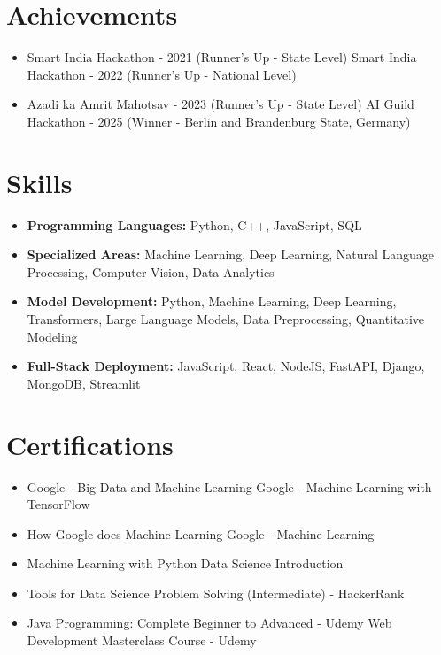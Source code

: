 \documentclass[a4paper,10pt]{article}
\begin{document}
\section*{Achievements}
\begin{itemize}
\item Smart India Hackathon - 2021 (Runner's Up - State Level) \hfill Smart India Hackathon - 2022 (Runner's Up - National Level)
\item Azadi ka Amrit Mahotsav - 2023 (Runner's Up - State Level) \hfill AI Guild Hackathon - 2025 (Winner - Berlin and Brandenburg State, Germany)
\end{itemize}

\section*{Skills}
\begin{itemize}
  \item \textbf{Programming Languages:} Python, C++, JavaScript, SQL
  \item \textbf{Specialized Areas:} Machine Learning, Deep Learning, Natural Language Processing, Computer Vision, Data Analytics
  \item \textbf{Model Development:} Python, Machine Learning, Deep Learning, Transformers, Large Language Models, Data Preprocessing, Quantitative Modeling
  \item \textbf{Full-Stack Deployment:} JavaScript, React, NodeJS, FastAPI, Django, MongoDB, Streamlit
\end{itemize}

\section*{Certifications}
\begin{itemize}
\item Google - Big Data and Machine Learning \hfill Google - Machine Learning with TensorFlow
\item How Google does Machine Learning \hfill Google - Machine Learning
\item Machine Learning with Python \hfill Data Science Introduction
\item Tools for Data Science \hfill Problem Solving (Intermediate) - HackerRank
\item Java Programming: Complete Beginner to Advanced - Udemy \hfill Web Development Masterclass Course - Udemy
\end{itemize}
\end{document}
